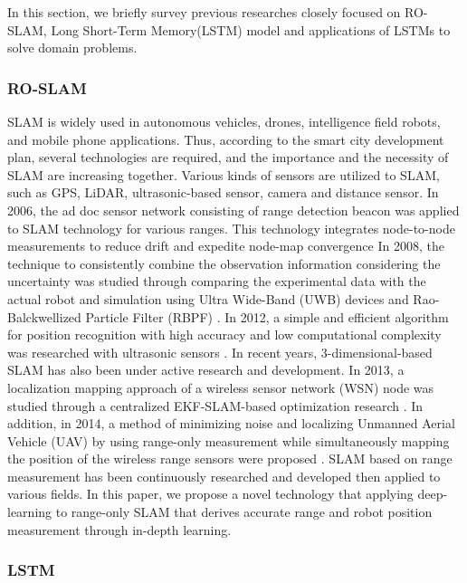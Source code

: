 \documentclass[letterpaper, 10 pt, conference]{ieeeconf}  %
\begin{document}
In this section, we briefly survey previous researches closely focused on 
RO-SLAM, Long Short-Term Memory(LSTM) model and applications of LSTMs to solve domain problems.

\subsubsection{RO-SLAM}

SLAM is widely used in autonomous vehicles, drones, intelligence field robots, and mobile phone applications. Thus, according to the smart city development plan, several technologies are required, and the importance and the necessity of SLAM are increasing together. Various kinds of sensors are utilized to SLAM, such as GPS, LiDAR, ultrasonic-based sensor, camera and distance sensor.
In 2006, the ad doc sensor network consisting of range detection beacon was applied to SLAM technology for various ranges. This technology integrates node-to-node measurements to reduce drift and expedite node-map convergence \cite{djugash2006range} In 2008, the technique to consistently combine the observation information considering the uncertainty was studied through comparing the experimental data with the actual robot and simulation using Ultra Wide-Band (UWB) devices and Rao-Balckwellized Particle Filter (RBPF) \cite{blanco2008pure}.  In 2012, a simple and efficient algorithm for position recognition with high accuracy and low computational complexity was researched with ultrasonic sensors \cite{yang2012efficient}. In recent years, 3-dimensional-based SLAM has also been under active research and development. In 2013, a localization mapping approach of a wireless sensor network (WSN) node was studied through a centralized EKF-SLAM-based optimization research \cite{fabresse2013undelayed}. In addition, in 2014, a method of minimizing noise and localizing Unmanned Aerial Vehicle (UAV) by using  range-only measurement while simultaneously mapping the position of the wireless range sensors were proposed \cite{fabresse2014robust}. 
SLAM based on range measurement has been continuously researched and developed then applied to various fields. In this paper, we propose a novel technology that applying deep-learning to range-only SLAM that derives accurate range and robot position measurement through in-depth learning. 


\subsubsection{LSTM}
\end{document}
